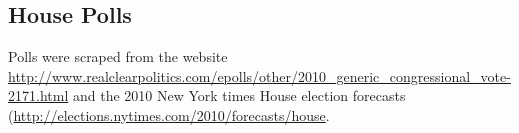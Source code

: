 \documentclass[12pt,final,fleqn]{article}
\theoremstyle{plain}
\begin{document}
\begin{appendices}
\subsection{House Polls}
Polls were scraped from the website \url{http://www.realclearpolitics.com/epolls/other/2010_generic_congressional_vote-2171.html} and the 2010 New York times House election forecasts (\url{http://elections.nytimes.com/2010/forecasts/house}.

\end{appendices}


\end{document}
